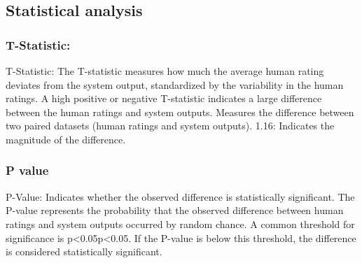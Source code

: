 \documentclass[a4j, twocolumn]{article}
\begin{document}
\subsection{Statistical analysis}
\subsubsection{T-Statistic: }
T-Statistic: The T-statistic measures how much the average human rating deviates from the system output, standardized by the variability in the human ratings.
A high positive or negative T-statistic indicates a large difference between the human ratings and system outputs.
Measures the difference between two paired datasets (human ratings and system outputs).
1.16: Indicates the magnitude of the difference.
\subsubsection{P value }
P-Value: Indicates whether the observed difference is statistically significant.
The P-value represents the probability that the observed difference between human ratings and system outputs occurred by random chance.
A common threshold for significance is p<0.05p<0.05. If the P-value is below this threshold, the difference is considered statistically significant.
\vspace{10pt} %
\begin{table}[H] %
    \centering
    \caption{P Value}
    \label{tab:correlation_table} %
\end{table}
\end{document}
